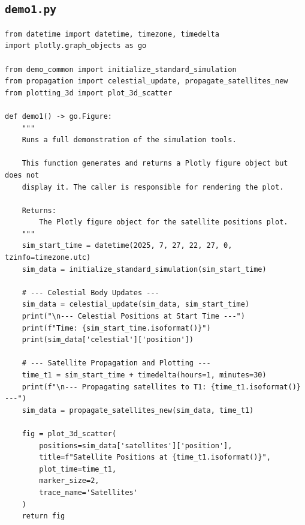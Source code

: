 \documentclass[11pt]{article}
\begin{document}
\subsection{\texttt{demo1.py}}
\begin{Verbatim}
from datetime import datetime, timezone, timedelta
import plotly.graph_objects as go

from demo_common import initialize_standard_simulation
from propagation import celestial_update, propagate_satellites_new
from plotting_3d import plot_3d_scatter

def demo1() -> go.Figure:
    """
    Runs a full demonstration of the simulation tools.

    This function generates and returns a Plotly figure object but does not
    display it. The caller is responsible for rendering the plot.

    Returns:
        The Plotly figure object for the satellite positions plot.
    """
    sim_start_time = datetime(2025, 7, 27, 22, 27, 0, tzinfo=timezone.utc)
    sim_data = initialize_standard_simulation(sim_start_time)

    # --- Celestial Body Updates ---
    sim_data = celestial_update(sim_data, sim_start_time)
    print("\n--- Celestial Positions at Start Time ---")
    print(f"Time: {sim_start_time.isoformat()}")
    print(sim_data['celestial']['position'])

    # --- Satellite Propagation and Plotting ---
    time_t1 = sim_start_time + timedelta(hours=1, minutes=30)
    print(f"\n--- Propagating satellites to T1: {time_t1.isoformat()} ---")
    sim_data = propagate_satellites_new(sim_data, time_t1)

    fig = plot_3d_scatter(
        positions=sim_data['satellites']['position'],
        title=f"Satellite Positions at {time_t1.isoformat()}",
        plot_time=time_t1,
        marker_size=2,
        trace_name='Satellites'
    )
    return fig
\end{Verbatim}
\end{document}
